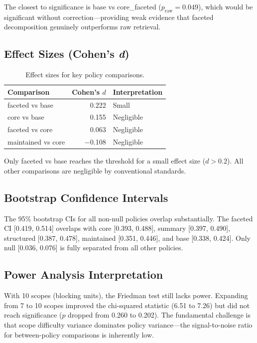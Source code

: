 \documentclass[11pt,a4paper]{article}
\begin{document}
The closest to significance is base vs core\_faceted ($p_{\text{raw}} = 0.049$), which would be significant without correction---providing weak evidence that faceted decomposition genuinely outperforms raw retrieval.

\subsection{Effect Sizes (Cohen's \emph{d})}

\begin{table}[H]
\centering
\caption{Effect sizes for key policy comparisons.}
\label{tab:cohens}
\begin{tabular}{@{}lrl@{}}
\toprule
\textbf{Comparison} & \textbf{Cohen's $d$} & \textbf{Interpretation} \\
\midrule
faceted vs base    & 0.222  & Small \\
core vs base       & 0.155  & Negligible \\
faceted vs core    & 0.063  & Negligible \\
maintained vs core & $-$0.108 & Negligible \\
\bottomrule
\end{tabular}
\end{table}

Only faceted vs base reaches the threshold for a small effect size ($d > 0.2$). All other comparisons are negligible by conventional standards.

\subsection{Bootstrap Confidence Intervals}

The 95\% bootstrap CIs for all non-null policies overlap substantially. The faceted CI [0.419, 0.514] overlaps with core [0.393, 0.488], summary [0.397, 0.490], structured [0.387, 0.478], maintained [0.351, 0.446], and base [0.338, 0.424]. Only null [0.036, 0.076] is fully separated from all other policies.

\subsection{Power Analysis Interpretation}

With 10 scopes (blocking units), the Friedman test still lacks power. Expanding from 7 to 10 scopes improved the chi-squared statistic (6.51 to 7.26) but did not reach significance ($p$ dropped from 0.260 to 0.202). The fundamental challenge is that scope difficulty variance dominates policy variance---the signal-to-noise ratio for between-policy comparisons is inherently low.
\end{document}
